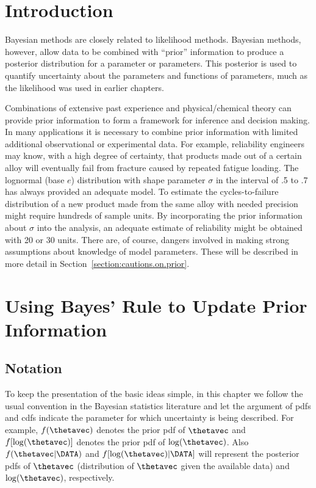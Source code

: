 
\section{Introduction}

Bayesian methods are closely related to likelihood methods. Bayesian
methods, however, allow data to be combined with ``prior'' information
to produce a posterior distribution for a parameter or parameters. This
posterior is used to quantify uncertainty about the parameters
and functions of parameters, much as the likelihood was used in earlier
chapters.

Combinations of extensive past experience and physical/chemical theory
can provide prior information to form a framework for inference and
decision making. In many applications
it is necessary to combine prior information with limited additional
observational or experimental data.  For example, reliability
engineers may know, with a high degree of certainty, that products
made out of a certain alloy will eventually fail from fracture caused
by repeated fatigue loading. The lognormal (base $e$) distribution with shape
parameter $\sigma$ in the interval of .5 to .7 has always provided an
adequate model. To estimate the cycles-to-failure distribution of a
new product made from the same alloy with needed precision might
require hundreds of sample units.  By incorporating the prior
information about $\sigma$ into the analysis, an adequate estimate of
reliability might be obtained with 20 or 30 units.  There are, of
course, dangers involved in making strong assumptions about knowledge
of model parameters. These will be described in more detail in
Section~\ref{section:cautions.on.prior}.

\section{Using Bayes' Rule to Update Prior Information}
\label{section:bayes.theorem}
\subsection{Notation}
To keep the presentation of the basic ideas simple, in this chapter we
follow the usual convention in the Bayesian statistics literature and
let the argument of pdfs and cdfs indicate the parameter for which
uncertainty is being described.  For example, $f(\thetavec)$ denotes
the prior pdf of $\thetavec$ and $f[\log(\thetavec)]$ denotes the
prior pdf of $\log(\thetavec)$.  Also $f(\thetavec | \DATA)$ and
$f[\log(\thetavec)|\DATA]$ will represent the posterior
pdfs of $\thetavec$ (distribution of $\thetavec$ given the available
data) and $\log(\thetavec)$, respectively.

